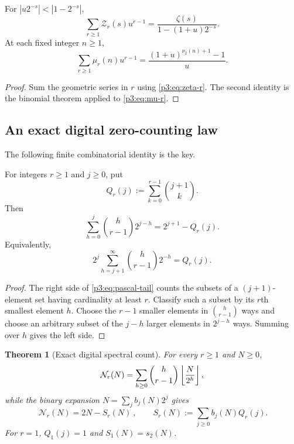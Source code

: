 \documentclass[11pt,oneside]{article}
\newtheorem{theorem}{Theorem}[section]
\theoremstyle{definition}
\theoremstyle{remark}
\begin{document}
\begin{corollary}\label{p3:cor:rank-resolvent}
For $|u2^{-s}|<|1-2^{-s}|$,
\begin{equation}\label{p3:eq:rank-resolvent}
 \sum_{r\ge1}\mathcal Z_r(s)u^{r-1}
 =\frac{\zeta(s)}{1-(1+u)2^{-s}}.
\end{equation}
At each fixed integer $n\ge1$,
\begin{equation}\label{p3:eq:mu-rank-gen}
 \sum_{r\ge1}\mu_r(n)u^{r-1}
 =\frac{(1+u)^{\nu_2(n)+1}-1}{u}.
\end{equation}
\end{corollary}

\begin{proof}
Sum the geometric series in $r$ using \eqref{p3:eq:zeta-r}.  The second identity is the binomial theorem applied to \eqref{p3:eq:mu-r}.
\end{proof}

\subsection{An exact digital zero-counting law}

The following finite combinatorial identity is the key.

\begin{lemma}\label{p3:lem:pascal-tail}
For integers $r\ge1$ and $j\ge0$, put
\begin{equation}\label{p3:eq:Qr}
  Q_r(j):=\sum_{k=0}^{r-1}\binom{j+1}{k}.
\end{equation}
Then
\begin{equation}\label{p3:eq:pascal-tail}
 \sum_{h=0}^{j}\binom h{r-1}2^{j-h}=2^{j+1}-Q_r(j).
\end{equation}
Equivalently,
\[
 2^j\sum_{h=j+1}^{\infty}\binom h{r-1}2^{-h}=Q_r(j).
\]
\end{lemma}

\begin{proof}
The right side of \eqref{p3:eq:pascal-tail} counts the subsets of a $(j+1)$-element set having cardinality at least $r$.  Classify such a subset by its $r$th smallest element $h$.  Choose the $r-1$ smaller elements in $\binom h{r-1}$ ways and choose an arbitrary subset of the $j-h$ larger elements in $2^{j-h}$ ways.  Summing over $h$ gives the left side.
\end{proof}

\begin{theorem}[Exact digital spectral count]\label{p3:thm:digital-count}
For every $r\ge1$ and $N\ge0$,
\begin{equation}\label{p3:eq:Nr-floor}
  \mathcal N_r(N)=\sum_{h\ge0}\binom h{r-1}\left\lfloor \frac N{2^h}\right\rfloor,
\end{equation}
while the binary expansion $N=\sum_jb_j(N)2^j$ gives
\begin{equation}\label{p3:eq:Nr-digital}
  \boxed{\ \mathcal N_r(N)=2N-S_r(N)\ },
  \qquad
  S_r(N):=\sum_{j\ge0}b_j(N)Q_r(j).
\end{equation}
For $r=1$, $Q_1(j)=1$ and $S_1(N)=s_2(N)$.
\end{theorem}
\end{document}
